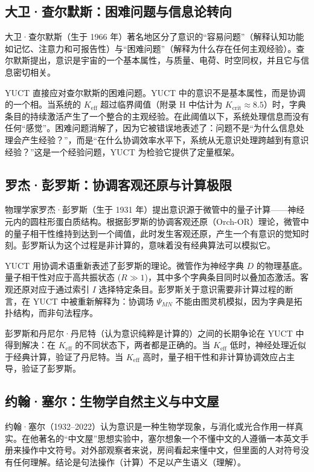 \documentclass[12pt,a4paper]{article}
\begin{document}
	\subsection{大卫·查尔默斯：困难问题与信息论转向}
	
	大卫·查尔默斯（生于 1966 年）著名地区分了意识的“容易问题”（解释认知功能如记忆、注意力和可报告性）与“困难问题”（解释为什么存在任何主观经验）。查尔默斯提出，意识是宇宙的一个基本属性，与质量、电荷、时空同权，并且它与信息密切相关。
	
	YUCT 直接应对查尔默斯的困难问题。YUCT 中的意识不是基本属性，而是协调的一个相。当系统的 \(K_{\mathrm{eff}}\) 超过临界阈值（附录 H 中估计为 \(K_{\mathrm{crit}} \approx 8.5\)）时，字典条目的持续激活产生了一个整合的主观经验。在此阈值以下，系统处理信息而没有任何“感觉”。困难问题消解了，因为它被错误地表述了：问题不是“为什么信息处理会产生经验？”，而是“在什么协调效率水平下，系统从无意识处理跨越到有意识经验？”这是一个经验问题，YUCT 为检验它提供了定量框架。
	
	\subsection{罗杰·彭罗斯：协调客观还原与计算极限}
	
	物理学家罗杰·彭罗斯（生于 1931 年）提出意识源于微管中的量子计算——神经元内的圆柱形蛋白质结构。根据彭罗斯的协调客观还原（Orch-OR）理论，微管中的量子相干性维持到达到一个阈值，此时发生客观还原，产生一个有意识的觉知时刻。彭罗斯认为这个过程是非计算的，意味着没有经典算法可以模拟它。
	
	YUCT 用协调术语重新表述了彭罗斯的理论。微管作为神经字典 \(D\) 的物理基底。量子相干性对应于高共振状态 (\(R \gg 1\))，其中多个字典条目同时以叠加态激活。客观还原对应于通过索引 \(I\) 选择特定条目。彭罗斯关于意识需要非计算过程的断言，在 YUCT 中被重新解释为：协调场 \(\Psi_{MN}\) 不能由图灵机模拟，因为字典是拓扑结构，而非句法程序。
	
	彭罗斯和丹尼尔·丹尼特（认为意识纯粹是计算的）之间的长期争论在 YUCT 中得到解决：在 \(K_{\mathrm{eff}}\) 的不同状态下，两者都是正确的。当 \(K_{\mathrm{eff}}\) 低时，神经处理近似于经典计算，验证了丹尼特。当 \(K_{\mathrm{eff}}\) 高时，量子相干性和非计算协调效应占主导，验证了彭罗斯。
	
	\subsection{约翰·塞尔：生物学自然主义与中文屋}
	
	约翰·塞尔（1932–2022）认为意识是一种生物学现象，与消化或光合作用一样真实。在他著名的“中文屋”思想实验中，塞尔想象一个不懂中文的人遵循一本英文手册来操作中文符号。对外部观察者来说，房间看起来懂中文，但里面的人对符号没有任何理解。结论是句法操作（计算）不足以产生语义（理解）。
	
\end{document}
